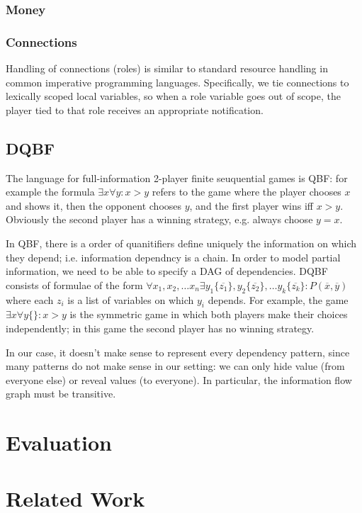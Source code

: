 \documentclass[acmsmall,review,anonymous]{acmart}\settopmatter{printfolios=true,printccs=false,printacmref=false}
\begin{document}
\subsubsection{Money}

\subsubsection{Connections}

Handling of connections (roles) is similar to standard resource handling in common imperative programming languages. Specifically, we tie connections to lexically scoped local variables, so when a role variable goes out of scope, the player tied to that role receives an appropriate notification.

\subsection{DQBF}
The language for full-information 2-player finite seuquential games is QBF: for example the formula $\exists x \forall y: x > y$ refers to the game where the player chooses $x$ and shows it, then the opponent chooses $y$, and the first player wins iff $x > y$. Obviously the second player has a winning strategy, e.g. always choose $y=x$.

In QBF, there is a order of quanitifiers define uniquely the information on which they depend; i.e. information dependncy is a chain. In order to model partial information, we need to be able to specify a DAG of dependencies. DQBF consists of formulae of the form $\forall x_1, x_2, \ldots x_n \exists y_1 \{\overline{z_1}\}, y_2 \{\overline{z_2}\}, \ldots y_k \{\overline{z_k}\}: P(\overline{x}, \overline{y})$ where each $z_i$ is a list of variables on which $y_i$ depends. For example, the game $\exists x \forall y\{\}: x > y$ is the symmetric game in which both players make their choices independently; in this game the second player has no winning strategy.

In our case, it doesn't make sense to represent every dependency pattern, since many patterns do not make sense in our setting: we can only hide value (from everyone else) or reveal values (to everyone). In particular, the information flow graph must be transitive.

\section{Evaluation}

\section{Related Work}
\end{document}
